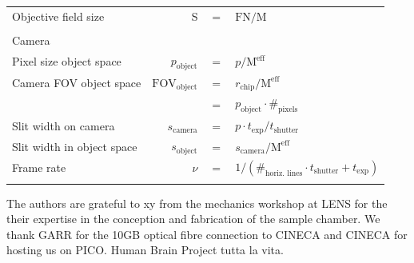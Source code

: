 \documentclass[12pt]{spieman}  %
\begin{document}
\begin{table}[t!]
\begin{tabular}{lrcl}
		Objective field size							& S															& $=$		& $\text{FN}/{\text{M}}$								\\\\
		\multicolumn{4}{l}{Camera}\\\hline\hline  
		Pixel size object space						& $ p_{\text{object}}$					& $=$		& $p/  \text{M}^{\text{eff}}$							\\
		Camera FOV object space						&$\text{FOV}_{\text{object}}$		& $=$		& $r_{\text{chip}} / \text{M}^{\text{eff}}$				\\
																			&																& $=$		& $p_{\text{object}} \cdot \#_{\text{pixels}}$			\\
		Slit width on camera							& $s_{\text{camera}}$						& $=$		& $ p \cdot t_{\text{exp}} / t_{\text{shutter}} $			\\
		Slit width in object space				& $s_{\text{object}}$						& $=$		& $ s_{\text{camera}}/ \text{M}^{\text{eff}}$			\\
		Frame rate												& $\nu$													& $=$		& $1/(\#_{\text{horiz. lines}} \cdot t_{\text{shutter}} + t_{\text{exp}})$ \\\\

		\end{tabular}
\end{table}
	


\acknowledgments
The authors are grateful to xy from the mechanics workshop at LENS for the their expertise in the conception and fabrication of the sample chamber. We thank GARR for the 10GB optical fibre connection to CINECA and  CINECA for hosting us on PICO. Human Brain Project tutta la vita. 


\end{document}
